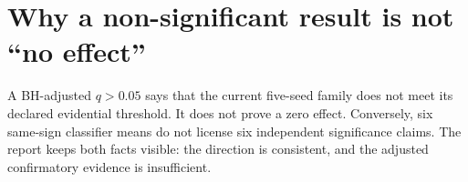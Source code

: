 \section{Why a non-significant result is not ``no effect''}

A BH-adjusted $q>0.05$ says that the current five-seed family does not meet its declared evidential threshold. It does not prove a zero effect. Conversely, six same-sign classifier means do not license six independent significance claims. The report keeps both facts visible: the direction is consistent, and the adjusted confirmatory evidence is insufficient.
